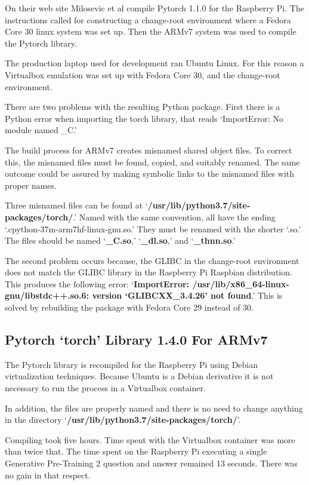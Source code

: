 On their web site Milosevic et al \cite{2018Milosevic} compile Pytorch 1.1.0 for the Raspberry Pi. The instructions called for constructing a change-root environment where a Fedora Core 30 linux system was set up. Then the ARMv7 system was used to compile the Pytorch library. %

The production laptop used for development ran Ubuntu Linux. For this reason a Virtualbox emulation was set up with Fedora Core 30, and the change-root environment.%

There are two problems with the resulting Python package. First there is a Python error when importing the torch library, that reads `ImportError: No module named \_C.' 

The build process for ARMv7 creates misnamed shared object files. To correct this, the misnamed files must be found, copied, and suitably renamed. The same outcome could be assured by making symbolic links to the misnamed files with proper names.

Three misnamed files can be found at `\textbf{/usr/lib/python3.7/site-packages/torch/}.' Named with the same convention, all have the ending `.cpython-37m-arm7hf-linux-gnu.so.' They must be renamed with the shorter `.so.' The files should be named `\textbf{\_C.so},' `\textbf{\_dl.so},' and `\textbf{\_thnn.so}.'

The second problem occurs because, the GLIBC in the change-root environment does not match the GLIBC library in the Raspberry Pi Raspbian distribution. This produces the following error: `\textbf{ImportError: /usr/lib/x86\_64-linux-gnu/libstdc++.so.6: version `GLIBCXX\_3.4.26' not found}.' This is solved by rebuilding the package with Fedora Core 29 instead of 30. 
 
\subsection{Pytorch `torch' Library 1.4.0 For ARMv7}
The Pytorch library is recompiled for the Raspberry Pi using Debian virtualization techniques. Because Ubuntu is a Debian derivative it is not necessary to run the process in a Virtualbox container. 

In addition, the files are properly named and there is no need to change anything in the directory `\textbf{/usr/lib/python3.7/site-packages/torch/}'. 

Compiling took five hours. Time spent with the Virtualbox container was more than twice that. The time spent on the Raspberry Pi executing a single Generative Pre-Training 2 question and answer remained 13 seconds. There was no gain in that respect.

